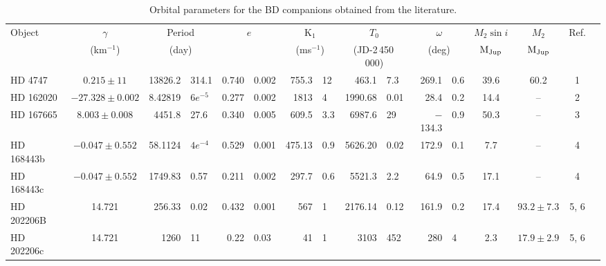 
\begin{table*}
    \begin{threeparttable}[b]

    \centering
    \tiny
    \caption{Orbital parameters for the BD companions obtained from the literature.}
    \begin{tabular}{l c r@{$ \,\pm\, $}l r@{$ \,\pm\, $}l r@{$ \,\pm\, $}l r@{$ \,\pm\, $}l r@{$ \,\pm\, $}l cc c c}
        \toprule
        Object  & \(\gamma \)  	& \multicolumn{2}{c}{Period}   & \multicolumn{2}{c}{\(e \) } &  \multicolumn{2}{c}{\(\textrm{K}_{1} \) } &  \multicolumn{2}{c}{\(T_{0} \)}  &  \multicolumn{2}{c}{ \(\omega \) } & \(M_2\sin{i}\) & \(M_2\) & Ref.\\
        & (km\(^{-1} \)) 	& \multicolumn{2}{c}{(day)}   	&    \multicolumn{2}{c}{}    &  \multicolumn{2}{c}{(ms\(^{-1} \))}   & \multicolumn{2}{c}{ (JD-2\,450\,000) } &  \multicolumn{2}{c}{(deg) } &   \(\rm {M}_{Jup} \)  &   \(\rm {M}_{Jup} \)   & \\
        \midrule
        {HD 4747}       & $0.215 \pm 11 $        	 &  13826.2  &  314.1            &  0.740 & 0.002  	& 755.3   &  12      & 463.1       &  7.3    & 269.1      &  0.6   &  39.6    & 60.2 			  & 1 \\
        {HD 162020}   & $-27.328\pm0.002$  	    &  8.42819  &  $6e^{-5}$   &  0.277 & 0.002   & 1813    &  4        & 1990.68   &  0.01  & 28.4        &  0.2   & 14.4     &     --   			  & 2 \\
        {HD 167665}   & $8.003 \pm 0.008$    	 & 4451.8 & 27.6   				   & 0.340 & 0.005 	  & 609.5   &  3.3     & 6987.6     &  29     & $-$134.3 & 0.9     & 50.3    &     --   			& 3 \\
        {HD 168443}b  & $-0.047\pm0.552$ 		& 58.1124 & $4e^{-4}$  		& 0.529 & 0.001   & 475.13 & 0.9      & 5626.20  &  0.02   & 172.9      & 0.1     & 7.7      &     --    			& 4 \\ 
        {HD 168443}c  & $-0.047\pm0.552$ 		 & 1749.83 & 0.57  			     & 0.211 & 0.002  	 & 297.7  & 0.6      & 5521.3     &  2.2     & 64.9       & 0.5     & 17.1    &     --    			  & 4 \\ 
        {HD 202206}B & 14.721     						& 256.33  &  0.02    		     & 0.432 & 0.001  	  & 567     &  1       & 2176.14    &  0.12   & 161.9     & 0.2  	& 17.4    & $93.2\pm7.3$   & 5, 6\\  
        {HD 202206}c & 14.721    						 & 1260 &  11			        	& 0.22 & 0.03 		  & 41    	& 1          & 3103 		& 452    & 280 		   & 4  	  & 2.3      & $17.9\pm2.9$  & 5, 6\\ 

\end{tabular}
\end{threeparttable}
\end{table*}
